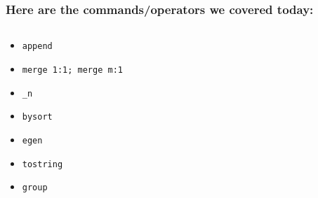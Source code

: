 \documentclass[11pt]{beamer}
\begin{document}
\begin{frame}
\frametitle{Here are the commands/operators we covered today:}
\begin{columns}
	\begin{column}{0.5\textwidth}
		\begin{itemize}
			\item \texttt{append}
			\item \texttt{merge 1:1; merge m:1}
			\item \texttt{\_n}
			\item \texttt{bysort}
			\item \texttt{egen}
			\item \texttt{tostring}
			\item \texttt{group}
		\end{itemize}
	\end{column}
	\begin{column}{0.5\textwidth}
	\end{column}
\end{columns}
\end{frame}
\end{document}
